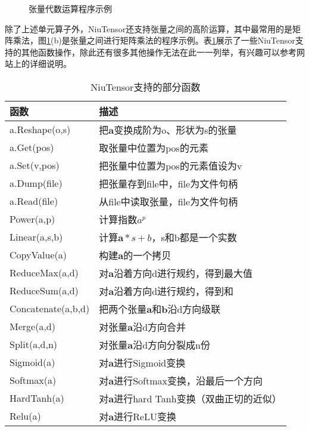 \begin{figure}[htp]
\centering

\caption{ 张量代数运算程序示例}
\label{fig:5-35}
\end{figure}

\parinterval 除了上述单元算子外，NiuTensor还支持张量之间的高阶运算，其中最常用的是矩阵乘法，图\ref{fig:5-35}(b)是张量之间进行矩阵乘法的程序示例。表\ref{tab:5-2}展示了一些NiuTensor支持的其他函数操作，除此还有很多其他操作无法在此一一列举，有兴趣可以参考网站上的详细说明。
\begin{table}[htp]
\centering
\caption{NiuTensor支持的部分函数}
\label{tab:5-2}
\small
\begin{tabular}{l | l}
\rule{0pt}{15pt}     函数 & 描述  \\
\hline
\rule{0pt}{15pt}     a.Reshape(o,s) & 把$ \mathbf a $变换成阶为o、形状为s的张量  \\
\rule{0pt}{15pt}     a.Get(pos) & 取张量中位置为pos的元素  \\
\rule{0pt}{15pt}     a.Set(v,pos) & 把张量中位置为pos的元素值设为v  \\
\rule{0pt}{15pt}     a.Dump(file) & 把张量存到file中，file为文件句柄  \\
\rule{0pt}{15pt}     a.Read(file) & 从file中读取张量，file为文件句柄  \\
\rule{0pt}{15pt}     Power(a,p) & 计算指数$ a^p $  \\
\rule{0pt}{15pt}     Linear(a,s,b) & 计算$ \mathbf a\ast s+b $，s和b都是一个实数  \\
\rule{0pt}{15pt}     CopyValue(a) & 构建$ \mathbf a $的一个拷贝  \\
\rule{0pt}{15pt}     ReduceMax(a,d) & 对$ \mathbf a $沿着方向d进行规约，得到最大值  \\
\rule{0pt}{15pt}     ReduceSum(a,d) & 对$ \mathbf a $沿着方向d进行规约，得到和  \\
\rule{0pt}{15pt}     Concatenate(a,b,d) & 把两个张量$ \mathbf a $和$ \mathbf b $沿d方向级联  \\
\rule{0pt}{15pt}     Merge(a,d) & 对张量$ \mathbf a $沿d方向合并  \\
\rule{0pt}{15pt}     Split(a,d,n) & 对张量$ \mathbf a $沿d方向分裂成n份  \\
\rule{0pt}{15pt}     Sigmoid(a) & 对$ \mathbf a $进行Sigmoid变换  \\
\rule{0pt}{15pt}     Softmax(a) & 对$ \mathbf a $进行Softmax变换，沿最后一个方向  \\
\rule{0pt}{15pt}     HardTanh(a) & 对$ \mathbf a $进行hard Tanh变换（双曲正切的近似）  \\
\rule{0pt}{15pt}     Relu(a) & 对$ \mathbf a $进行ReLU变换  \\
\end{tabular}
\end{table}

